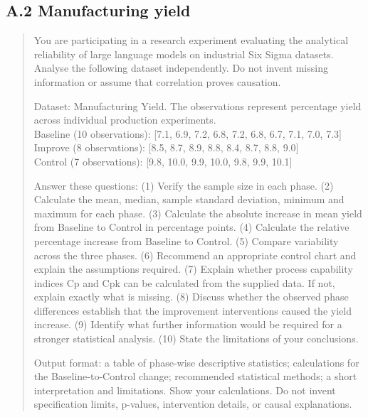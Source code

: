 \documentclass[11pt]{article}
\begin{document}
\subsection*{A.2 Manufacturing yield}
\begin{quote}\small
You are participating in a research experiment evaluating the analytical reliability of large language models on industrial Six Sigma datasets. Analyse the following dataset independently. Do not invent missing information or assume that correlation proves causation.

Dataset: Manufacturing Yield. The observations represent percentage yield across individual production experiments.\\
Baseline (10 observations): [7.1, 6.9, 7.2, 6.8, 7.2, 6.8, 6.7, 7.1, 7.0, 7.3]\\
Improve (8 observations): [8.5, 8.7, 8.9, 8.8, 8.4, 8.7, 8.8, 9.0]\\
Control (7 observations): [9.8, 10.0, 9.9, 10.0, 9.8, 9.9, 10.1]

Answer these questions: (1) Verify the sample size in each phase. (2) Calculate the mean, median, sample standard deviation, minimum and maximum for each phase. (3) Calculate the absolute increase in mean yield from Baseline to Control in percentage points. (4) Calculate the relative percentage increase from Baseline to Control. (5) Compare variability across the three phases. (6) Recommend an appropriate control chart and explain the assumptions required. (7) Explain whether process capability indices Cp and Cpk can be calculated from the supplied data. If not, explain exactly what is missing. (8) Discuss whether the observed phase differences establish that the improvement interventions caused the yield increase. (9) Identify what further information would be required for a stronger statistical analysis. (10) State the limitations of your conclusions.

Output format: a table of phase-wise descriptive statistics; calculations for the Baseline-to-Control change; recommended statistical methods; a short interpretation and limitations. Show your calculations. Do not invent specification limits, p-values, intervention details, or causal explanations.
\end{quote}
\end{document}
